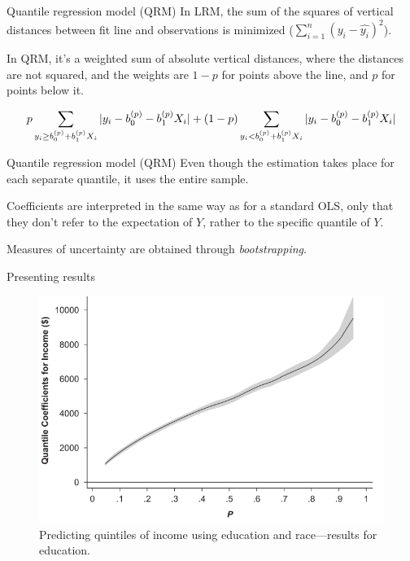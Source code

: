 \documentclass[12pt,english,pdf,xcolor=dvipsnames,aspectratio=169,handout]{beamer}\usepackage[]{graphicx}\usepackage[]{xcolor}
\begin{document}
\begin{frame}{Quantile regression model (QRM)}
In LRM, the sum of the squares of vertical distances between fit line and observations is minimized ($\sum_{i=1}^n(y_i - \hat{y_i})^2$).\bigskip

In QRM, it's a weighted sum of absolute vertical distances, where the distances are not squared, and the weights are $1-p$ for points above the line, and $p$ for points below it.\bigskip

\begin{equation}
\footnotesize
p\sum_{y_i \geq b_0^{(p)} + b_1^{(p)}X_i}|y_i - b_0^{(p)} - b_1^{(p)}X_i| + (1-p)\sum_{y_i < b_0^{(p)} + b_1^{(p)}X_i}|y_i - b_0^{(p)} - b_1^{(p)}X_i| 
\end{equation}

\end{frame}


\begin{frame}{Quantile regression model (QRM)}
Even though the estimation takes place for each separate quantile, it uses the entire sample.\bigskip

Coefficients are interpreted in the same way as for a standard OLS, only that they don't refer to the expectation of $Y$, rather to the specific quantile of $Y$.\bigskip

Measures of uncertainty are obtained through \textit{bootstrapping}.

\end{frame}



\begin{frame}{Presenting results}

\begin{figure}
\centering
\includegraphics[scale=0.50]{../04-graphs/05-09}
\caption{Predicting quintiles of income using education and race---results for education.}
\end{figure}

\end{frame}
\end{document}
